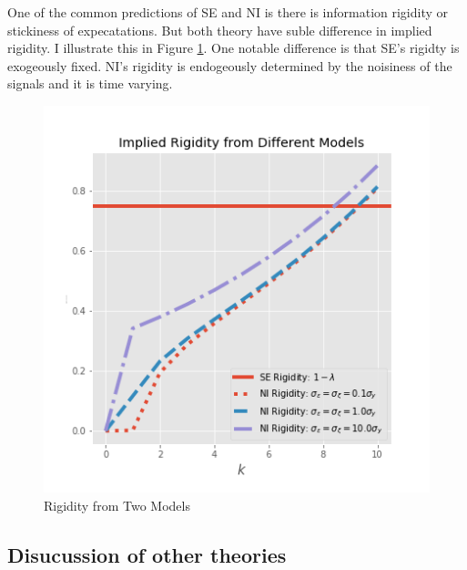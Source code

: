 \documentclass[]{article}
\begin{document}
One of the common predictions of SE and NI is there is information rigidity or stickiness of expecatations.  But both theory have suble difference in implied rigidity. I illustrate this in Figure \ref{rigidity}. One notable difference is that SE's rigidty is exogeously fixed. NI's rigidity is endogeously determined by the noisiness of the signals and it is time varying. 
 
\begin{figure}[ht]
	\centering
	\includegraphics[width=13cm]{figures/rigidity.png} 
	\caption{Rigidity from Two Models}
	\label{rigidity}
\end{figure}


\subsection{Disucussion of other theories}
\end{document}
